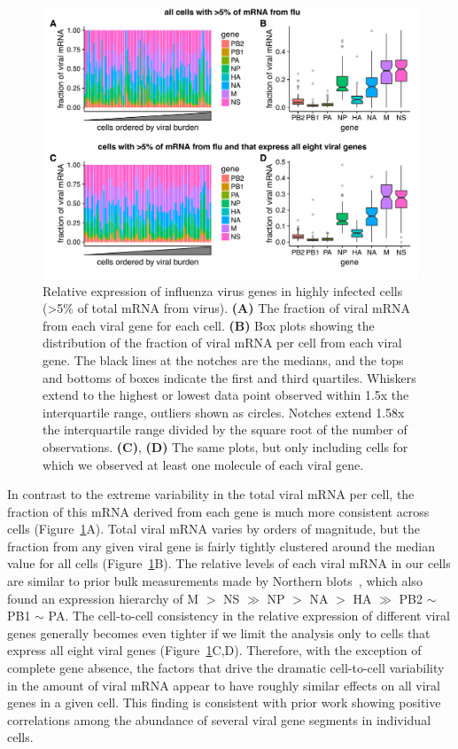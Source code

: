 \documentclass[9pt,lineno]{elife}
\begin{document}
\begin{figure}
\centerline{\includegraphics[width=0.9\linewidth]{figures/p_flu_expr_aledit.pdf}}
\caption{\label{fig:fluexpr}
Relative expression of influenza virus genes in highly infected cells (>5\% of total mRNA from virus).
{\bf (A)} 
The fraction of viral mRNA from each viral gene for each cell. 
{\bf (B)}
Box plots showing the distribution of the fraction of viral mRNA per cell from each viral gene.
The black lines at the notches are the medians, and the tops and bottoms of boxes indicate the first and third quartiles.
Whiskers extend to the highest or lowest data point observed within 1.5x the interquartile range, outliers shown as circles.
Notches extend 1.58x the interquartile range divided by the square root of the number of observations. 
{\bf (C)}, {\bf (D)} 
The same plots, but only including cells for which we observed at least one molecule of each viral gene.
}
\end{figure}

In contrast to the extreme variability in the total viral mRNA per cell, the fraction of this mRNA derived from each gene is much more consistent across cells (Figure~\ref{fig:fluexpr}A).
Total viral mRNA varies by orders of magnitude, but the fraction from any given viral gene is fairly tightly clustered around the median value for all cells (Figure~\ref{fig:fluexpr}B).
The relative levels of each viral mRNA in our cells are similar to prior bulk measurements made by Northern blots~\citep{hatada1989control}, which also found an expression hierarchy of M $>$ NS $\gg$ NP $>$ NA $>$ HA $\gg$ PB2 $\sim$ PB1 $\sim$ PA.
The cell-to-cell consistency in the relative expression of different viral genes generally becomes even tighter if we limit the analysis only to cells that express all eight viral genes (Figure~\ref{fig:fluexpr}C,D).
Therefore, with the exception of complete gene absence, the factors that drive the dramatic cell-to-cell variability in the amount of viral mRNA appear to have roughly similar effects on all viral genes in a given cell.
This finding is consistent with prior work showing positive correlations among the abundance of several viral gene segments in individual cells.
\end{document}
